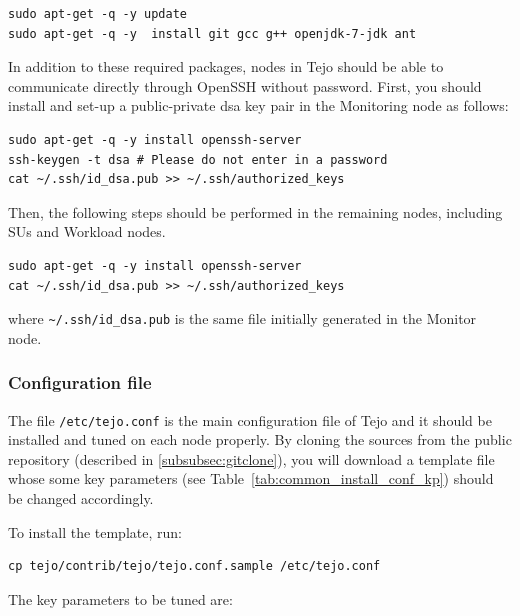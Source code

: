 \begin{lstlisting}
sudo apt-get -q -y update 
sudo apt-get -q -y  install git gcc g++ openjdk-7-jdk ant
\end{lstlisting}

In addition to these required packages, nodes in Tejo should be able to communicate directly through OpenSSH without password. First, you should install and set-up a public-private dsa key pair in the Monitoring node as follows:

\begin{lstlisting}
sudo apt-get -q -y install openssh-server
ssh-keygen -t dsa # Please do not enter in a password
cat ~/.ssh/id_dsa.pub >> ~/.ssh/authorized_keys
\end{lstlisting}

Then, the following steps should be performed in the remaining nodes, including SUs and Workload nodes.

\begin{lstlisting}
sudo apt-get -q -y install openssh-server
cat ~/.ssh/id_dsa.pub >> ~/.ssh/authorized_keys
\end{lstlisting}
where \verb|~/.ssh/id_dsa.pub| is the same file initially generated in the Monitor node.
 
\subsubsection{Configuration file}

The file \verb|/etc/tejo.conf| is the main configuration file of Tejo and it should be installed and tuned on each node properly. By cloning the sources from the public repository (described in \ref{subsubsec:gitclone}), you will download a template file whose some key parameters (see Table~\ref{tab:common_install_conf_kp}) should be changed accordingly.

To install the template, run:
\begin{lstlisting}
cp tejo/contrib/tejo/tejo.conf.sample /etc/tejo.conf
\end{lstlisting}

The key parameters to be tuned are:

